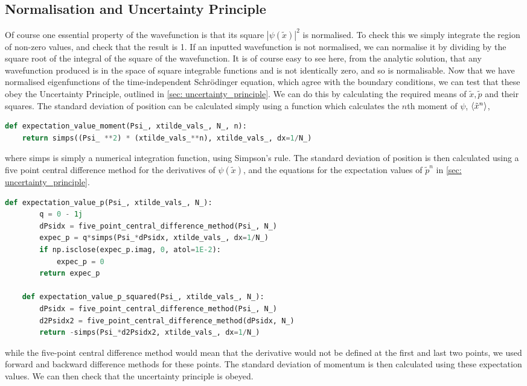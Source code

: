 \documentclass[10pt,a4paper]{article}
\theoremstyle{definition}
\theoremstyle{remark}
\begin{document}
\subsection{Normalisation and Uncertainty Principle}
\indent Of course one essential property of the wavefunction is that its square $|\psi(\tilde{x})|^2$ is normalised. To check this we simply integrate the region of non-zero values, and check that the result is 1. If an inputted wavefunction is not normalised, we can normalise it by dividing by the square root of the integral of the square of the wavefunction. It is of course easy to see here, from the analytic solution, that any wavefunction produced is in the space of square integrable functions and is not identically zero, and so is normalisable.
\indent Now that we have normalised eigenfunctions of the time-independent Schr\"{o}dinger equation, which agree with the boundary conditions, we can test that these obey the Uncertainty Principle, outlined in \ref{sec: uncertainty_principle}. We can do this by calculating the required means of $\tilde{x}, \tilde{p}$ and their squares. The standard deviation of position can be calculated simply using a function which calculates the $n$th moment of $\psi$, $\braket{\tilde{x}^n}$,
\begin{lstlisting}[language=Python]
    def expectation_value_moment(Psi_, xtilde_vals_, N_, n):
    return simps((Psi_ **2) * (xtilde_vals_**n), xtilde_vals_, dx=1/N_)
\end{lstlisting}
where simps is simply a numerical integration function, using Simpson's rule. The standard deviation of position is then calculated using a five point central difference method for the derivatives of $\psi(\tilde{x})$, and the equations for the expectation values of $\tilde{p}^n$ in \ref{sec: uncertainty_principle}. 
\begin{lstlisting}[language=Python]
    def expectation_value_p(Psi_, xtilde_vals_, N_):
        q = 0 - 1j
        dPsidx = five_point_central_difference_method(Psi_, N_)
        expec_p = q*simps(Psi_*dPsidx, xtilde_vals_, dx=1/N_)
        if np.isclose(expec_p.imag, 0, atol=1E-2):
            expec_p = 0
        return expec_p

    def expectation_value_p_squared(Psi_, xtilde_vals_, N_):
        dPsidx = five_point_central_difference_method(Psi_, N_)
        d2Psidx2 = five_point_central_difference_method(dPsidx, N_)
        return -simps(Psi_*d2Psidx2, xtilde_vals_, dx=1/N_)
\end{lstlisting}
while the five-point central difference method would mean that the derivative would not be defined at the first and last two points, we used forward and backward difference methods for these points. The standard deviation of momentum is then calculated using these expectation values. We can then check that the uncertainty principle is obeyed.
\end{document}
